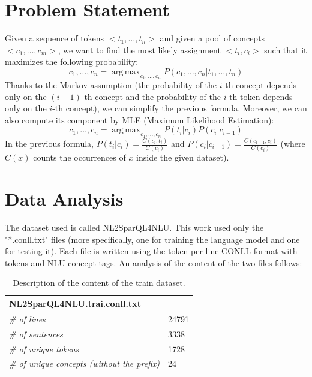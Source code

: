 \documentclass[11pt,a4paper]{article}
\DeclareMathOperator*{\argmax}{arg\,max}
\begin{document}
\section{Problem Statement}
Given a sequence of tokens $<t_1, \ldots, t_n>$ and given a pool of concepts $<c_1, \ldots, c_m>$, we want to find the most likely assignment $<t_i, c_i>$ such that it maximizes the following probability:
\begin{equation*}
c_1, \ldots, c_n = \argmax_{c_1, \ldots, c_n} P (c_1, \ldots, c_n | t_1, \ldots, t_n)
\end{equation*}
Thanks to the Markov assumption (the probability of the $i$-th concept depends only on the $(i-1)$-th concept and the probability of the $i$-th token depends only on the $i$-th concept), we can simplify the previous formula. Moreover, we can also compute its component by MLE (Maximum Likelihood Estimation):
\begin{equation*}
c_1, \ldots, c_n = \argmax_{c_1, \ldots, c_n} P(t_i|c_i)P(c_i| c_{i-1})
\end{equation*}
In the previous formula, $P(t_i|c_i) = \frac{C(c_i, t_i)}{C(c_i)}$ and $P(c_i|c_{i-1}) = \frac{C(c_{i-1}, c_i)}{C(c_i)}$ (where $C(x)$ counts the occurrences of $x$ inside the given dataset). 

\section{Data Analysis}
The dataset used is called NL2SparQL4NLU. This work used only the "*.conll.txt" files (more specifically, one for training the language model and one for testing it). Each file is written using the token-per-line CONLL format with tokens and NLU concept tags. An analysis of the content of the two files follows:
\begin{table}[h]
\centering
\begin{tabular}{|l|l|}
\hline
\multicolumn{2}{|l|}{\textbf{NL2SparQL4NLU.trai.conll.txt}} \\ \hline
\textit{\# of lines}									& 24791 \\ \hline
\textit{\# of sentences}                             & 3338 \\ \hline
\textit{\# of unique tokens}                         & 1728 \\ \hline
\textit{\# of unique concepts (without the prefix)}  & 24   \\ \hline
\end{tabular}
\caption{Description of the content of the train dataset.}
\label{tab:train-dataset-description}
\end{table} 
\end{document}
